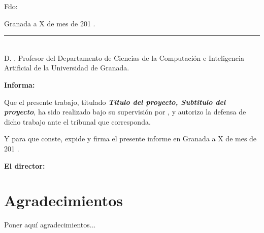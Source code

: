 \vspace{6cm}

\noindent Fdo: \autor{}

\vspace{2cm}

\begin{flushright}
Granada a X de mes de 201 .
\end{flushright}


\cleardoublepage
\thispagestyle{empty}

\noindent\rule[-1ex]{\textwidth}{2pt}\\[4.5ex]

D. \textbf{\director{}}, Profesor del Departamento de Ciencias de la Computación e Inteligencia Artificial
de la Universidad de Granada.


\vspace{0.5cm}

\textbf{Informa:}

\vspace{0.5cm}

Que el presente trabajo, titulado \textit{\textbf{Título del proyecto, Subtítulo del proyecto}},
ha sido realizado bajo su supervisión por \textbf{\autor{}}, y autorizo la defensa de dicho trabajo ante el tribunal
que corresponda.

\vspace{0.5cm}

Y para que conste, expide y firma el presente informe en Granada a X de mes de 201 .

\vspace{1cm}

\textbf{El director:}

\vspace{5cm}

\noindent \textbf{\director{} }

\chapter*{Agradecimientos}
\thispagestyle{empty}

       \vspace{1cm}


Poner aquí agradecimientos...

